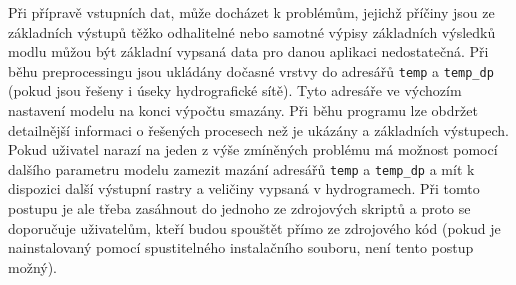 Při přípravě vstupních dat, může docházet k problémům, jejichž příčiny jsou ze základních výstupů těžko odhalitelné nebo samotné výpisy základních výsledků modlu  můžou být základní vypsaná data pro danou aplikaci nedostatečná. Při běhu preprocessingu jsou ukládány dočasné vrstvy do adresářů {\tt temp} a {\tt temp\_dp} (pokud jsou řešeny i úseky hydrografické sítě). Tyto adresáře ve výchozím nastavení modelu na konci výpočtu smazány. Při běhu programu lze obdržet detailnější informaci o řešených procesech než je ukázány a základních výstupech. Pokud uživatel narazí na jeden z výše zmíněných problému má možnost pomocí dalšího parametru modelu zamezit mazání adresářů {\tt temp} a {\tt temp\_dp} a mít k dispozici další výstupní rastry a veličiny vypsaná v hydrogramech. Při tomto postupu je ale třeba zasáhnout do jednoho ze zdrojových skriptů a proto se doporučuje uživatelům, kteří budou \smod spouštět přímo ze zdrojového kód (pokud je \smod nainstalovaný pomocí spustitelného instalačního souboru, není tento postup možný). 